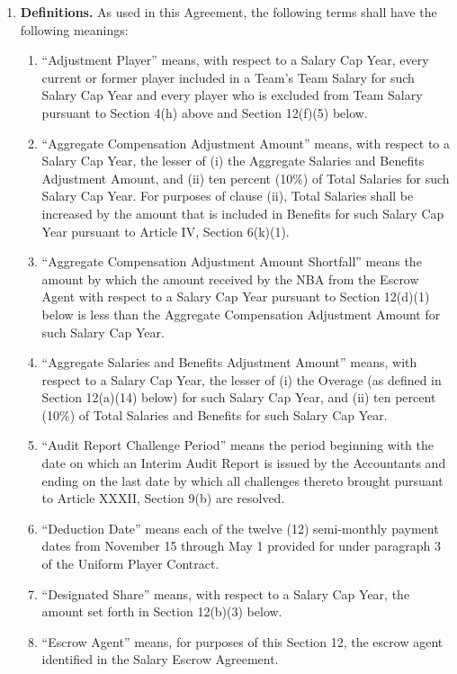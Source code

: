 \documentclass[
]{book}
\providecommand{\tightlist}{%
  \setlength{\itemsep}{0pt}\setlength{\parskip}{0pt}}
\begin{document}
\begin{enumerate}
\def\labelenumi{(\alph{enumi})}
\tightlist
\item
  \textbf{Definitions.} As used in this Agreement, the following terms shall have the following meanings:

  \begin{enumerate}
  \def\labelenumii{(\arabic{enumii})}
  \tightlist
  \item
    ``Adjustment Player'' means, with respect to a Salary Cap Year, every current or former player included in a Team's Team Salary for such Salary Cap Year and every player who is excluded from Team Salary pursuant to Section 4(h) above and Section 12(f)(5) below.
  \item
    ``Aggregate Compensation Adjustment Amount'' means, with respect to a Salary Cap Year, the lesser of (i) the Aggregate Salaries and Benefits Adjustment Amount, and (ii) ten percent (10\%) of Total Salaries for such Salary Cap Year. For purposes of clause (ii), Total Salaries shall be increased by the amount that is included in Benefits for such Salary Cap Year pursuant to Article IV, Section 6(k)(1).
  \item
    ``Aggregate Compensation Adjustment Amount Shortfall'' means the amount by which the amount received by the NBA from the Escrow Agent with respect to a Salary Cap Year pursuant to Section 12(d)(1) below is less than the Aggregate Compensation Adjustment Amount for such Salary Cap Year.
  \item
    ``Aggregate Salaries and Benefits Adjustment Amount'' means, with respect to a Salary Cap Year, the lesser of (i) the Overage (as defined in Section 12(a)(14) below) for such Salary Cap Year, and (ii) ten percent (10\%) of Total Salaries and Benefits for such Salary Cap Year.
  \item
    ``Audit Report Challenge Period'' means the period beginning with the date on which an Interim Audit Report is issued by the Accountants and ending on the last date by which all challenges thereto brought pursuant to Article XXXII, Section 9(b) are resolved.
  \item
    ``Deduction Date'' means each of the twelve (12) semi-monthly payment dates from November 15 through May 1 provided for under paragraph 3 of the Uniform Player Contract.
  \item
    ``Designated Share'' means, with respect to a Salary Cap Year, the amount set forth in Section 12(b)(3) below.
  \item
    ``Escrow Agent'' means, for purposes of this Section 12, the escrow agent identified in the Salary Escrow Agreement.

\end{enumerate}
\end{enumerate}
\end{document}
